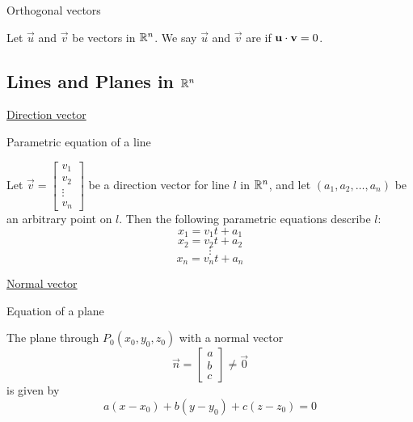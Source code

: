 \documentclass{ximera}
\begin{document}

Orthogonal vectors
\begin{expandable}
Let $\vec{u}$ and $\vec{v}$ be vectors in $\mathbb{R}^n$. We say $\vec{u}$ and $\vec{v}$ are  if $\mathbf{u}\cdot \mathbf{v}=0$.
\end{expandable}


\subsection{Lines and Planes in $\mathbb{R}^n$}

\href{https://ximera.osu.edu/oerlinalg/LinearAlgebra/RRN-0020/main}{Direction vector}


Parametric equation of a line 
\begin{expandable}
    Let $\vec{v}=\begin{bmatrix}v_1\\v_2\\\vdots\\v_n\end{bmatrix}$ be a direction vector for line $l$ in $\mathbb{R}^n$, and let $(a_1, a_2,\ldots , a_n)$ be an arbitrary point on $l$.  Then the following parametric equations describe $l$:
\[
x_1=v_1t+a_1\]
\[x_2=v_2t+a_2\]
\[\vdots\]
\[x_n=v_nt+a_n
\]
\end{expandable}


\href{https://ximera.osu.edu/oerlinalg/LinearAlgebra/RRN-0030/main}{Normal vector}


Equation of a plane
\begin{expandable}
The plane through $P_{0}(x_{0}, y_{0}, z_{0})$ with a normal vector $$\vec{n} = 
\begin{bmatrix}
a\\
b\\
c
\end{bmatrix}\neq\vec{0}$$
 is given by
$$a(x - x_{0}) + b(y - y_{0}) + c(z - z_{0}) = 0$$
\end{expandable}
\end{document}
